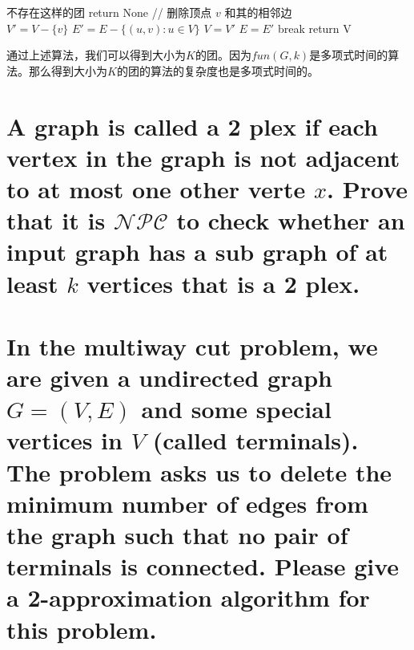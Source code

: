 \documentclass[]{article}
\begin{document}
\begin{multicols}{2}
\begin{algorithm}[H]
	\caption{找到大小为$ K $的团}
	{
		不存在这样的团\;	
		return None\;	
	}
	{
		// 删除顶点 $ v $ 和其的相邻边\\
		$ V' = V - \{ v\} $\;
		$ E' = E - \{(u, v):u \in V\} $\;
		{
			$ V = V' $\;
			$ E = E' $\;
		}
		{
			break\;
		}
	}
	return V \;
\end{algorithm}

{\large 通过上述算法，我们可以得到大小为$ K $的团。因为$ fun(G, k) $是多项式时间的算法。那么得到大小为$ K $的团的算法的复杂度也是多项式时间的。}


\newpage
\section{A graph is called a 2 plex if each vertex in the graph is not adjacent to at most one other verte $ x $. Prove that it is $ \mathcal{NPC}$ to check whether an input graph has a sub graph of at least $ k $ vertices that is a 2 plex.}


\newpage
\section{In the multiway cut problem, we are given a undirected graph $ G=(V,E) $ and some special vertices in $ V $ (called terminals). The problem asks us to delete the minimum number of edges from the graph such that no pair of terminals is connected. Please give a 2-approximation algorithm for this problem.}


\newpage
\end{multicols}
\end{document}
